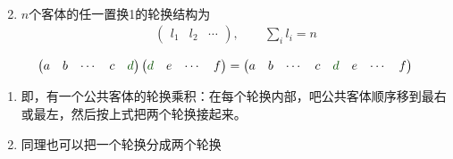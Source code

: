 \begin{note}
\begin{enumerate}
\begin{equation}
\begin{aligned}
		\end{aligned}\end{equation}
		\item
		$n$个客体的任一置换1的轮换结构为
		\begin{equation}\begin{aligned}
		\begin{pmatrix}
		l_1&l_2&\cdots
		\end{pmatrix},\qquad
		\sum_i l_i =n
		\end{aligned}\end{equation}		
	\end{enumerate}
\end{note}

\begin{newprop}[胶水公式]
	\begin{equation}\begin{aligned}
	\begin{pmatrix}
	a&b&\cdots&c&{\color{seco}d}
	\end{pmatrix}
	\begin{pmatrix}
	{\color{seco}d}&e&\cdots&f
	\end{pmatrix}
	=\begin{pmatrix}
	a&b&\cdots&c&{\color{seco}d}&e&\cdots&f
	\end{pmatrix}
\end{aligned}\end{equation}
\end{newprop}

\begin{note}
	\begin{enumerate}
		\item 
		即，有一个公共客体的轮换乘积：在每个轮换内部，吧公共客体顺序移到最右或最左，然后按上式把两个轮换接起来。
		
		\item 同理也可以把一个轮换分成两个轮换
	\end{enumerate}
\end{note}

